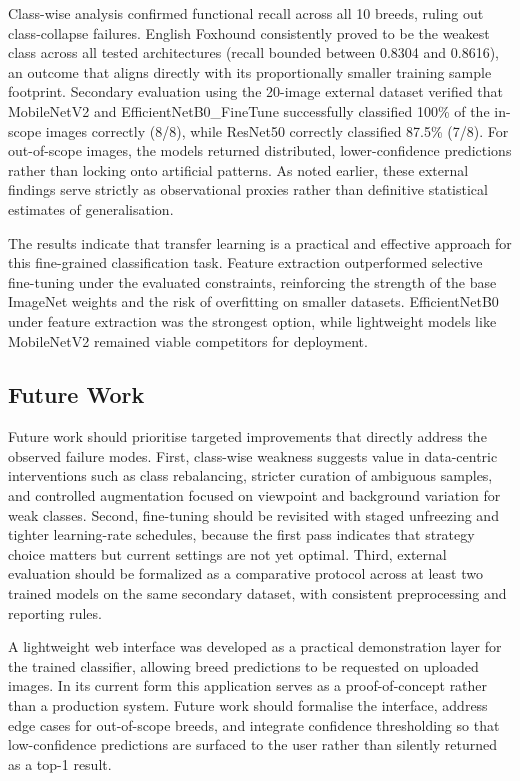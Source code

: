 \documentclass[12pt, a4paper]{article}
\begin{document}
Class-wise analysis confirmed functional recall across all 10 breeds, ruling out class-collapse failures. English Foxhound consistently proved to be the weakest class across all tested architectures (recall bounded between 0.8304 and 0.8616), an outcome that aligns directly with its proportionally smaller training sample footprint. Secondary evaluation using the 20-image external dataset verified that MobileNetV2 and EfficientNetB0\_FineTune successfully classified 100\% of the in-scope images correctly (8/8), while ResNet50 correctly classified 87.5\% (7/8). For out-of-scope images, the models returned distributed, lower-confidence predictions rather than locking onto artificial patterns. As noted earlier, these external findings serve strictly as observational proxies rather than definitive statistical estimates of generalisation.

The results indicate that transfer learning is a practical and effective approach for this fine-grained classification task. Feature extraction outperformed selective fine-tuning under the evaluated constraints, reinforcing the strength of the base ImageNet weights and the risk of overfitting on smaller datasets. EfficientNetB0 under feature extraction was the strongest option, while lightweight models like MobileNetV2 remained viable competitors for deployment.

\subsection{Future Work}

Future work should prioritise targeted improvements that directly address the observed failure modes. First, class-wise weakness suggests value in data-centric interventions such as class rebalancing, stricter curation of ambiguous samples, and controlled augmentation focused on viewpoint and background variation for weak classes. Second, fine-tuning should be revisited with staged unfreezing and tighter learning-rate schedules, because the first pass indicates that strategy choice matters but current settings are not yet optimal. Third, external evaluation should be formalized as a comparative protocol across at least two trained models on the same secondary dataset, with consistent preprocessing and reporting rules.

A lightweight web interface was developed as a practical demonstration layer for the trained classifier, allowing breed predictions to be requested on uploaded images. In its current form this application serves as a proof-of-concept rather than a production system. Future work should formalise the interface, address edge cases for out-of-scope breeds, and integrate confidence thresholding so that low-confidence predictions are surfaced to the user rather than silently returned as a top-1 result.
\end{document}
